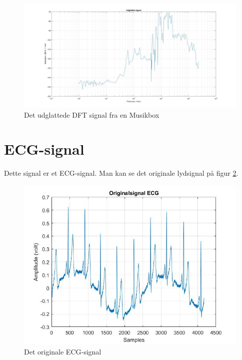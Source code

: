 \begin{figure}[H]
	\centering
	\includegraphics[width=140mm]{figures/Musikbox/udglattet.jpg}
	\caption{Det udglattede DFT signal fra en Musikbox}
	\label{fig:Musikbox udglattet}
\end{figure}

\section{ECG-signal}
Dette signal er et ECG-signal. Man kan se det originale lydsignal på figur \ref{fig:ECG original}.
\begin{figure}[H]
	\centering
	\includegraphics[width=140mm]{figures/ECG/original.jpg}
	\caption{Det originale ECG-signal}
	\label{fig:ECG original}
\end{figure}

